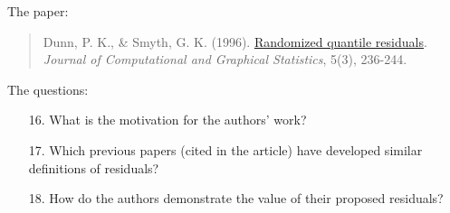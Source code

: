 \documentclass[12pt]{article}
\begin{document}
\noindent The paper:

\begin{quote}
Dunn, P. K., \& Smyth, G. K. (1996). \href{https://www.jstor.org/stable/1390802}{Randomized quantile residuals}. \textit{Journal of Computational and Graphical Statistics}, 5(3), 236-244.
\end{quote}

\noindent The questions:

\begin{enumerate}
\item[16.] What is the motivation for the authors' work?

\item[17.] Which previous papers (cited in the article) have developed similar definitions of residuals?

\item[18.] How do the authors demonstrate the value of their proposed residuals?
\end{enumerate}
\end{document}
